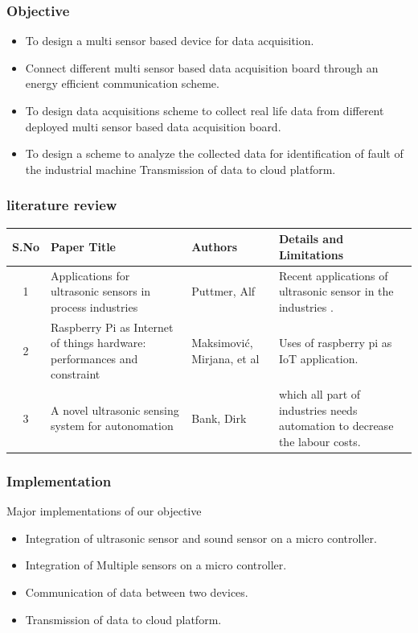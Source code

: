 \documentclass{beamer}
\begin{document}
\begin{frame}\frametitle{Objective}
\begin{itemize}

\item To design a multi sensor based device for data acquisition.
\item Connect different multi sensor based data acquisition board through an energy efficient communication scheme.
\item To design data acquisitions scheme to collect real life data from different deployed multi sensor based data acquisition board.
\item To design a scheme to analyze the collected data for identification of fault of the industrial machine Transmission of data to cloud platform.

\end{itemize}
\end{frame}
\begin{frame}[shrink=20]\frametitle{literature review}
\begin{table}[h]
    \begin{tabular}{|c|p{3cm}|p{3cm}|p{3cm}|}
    \hline
    \textbf{S.No} & \textbf{Paper Title} & \textbf{Authors} & \textbf{Details and Limitations}\\
    \hline
    1 &Applications for ultrasonic sensors in process industries &  Puttmer, Alf & Recent applications of ultrasonic sensor in the industries .\\
    \hline
    2 &Raspberry Pi as Internet of things hardware: performances and constraint &  Maksimović, Mirjana, et al & Uses of raspberry pi as IoT application.\\
    \hline
    3 & A novel ultrasonic sensing system for autonomation  &  Bank, Dirk & which all part of industries needs automation to decrease the labour costs.\\
    \hline
 
  \end{tabular}
\end{table}
\end{frame}
\begin{frame}\frametitle{Implementation}
\item Major implementations of our objective 
\begin{itemize}

\item Integration of ultrasonic sensor and sound sensor on a micro controller.
\item Integration of Multiple sensors on a micro controller.
\item Communication of data between two devices.
\item Transmission of data to cloud platform.

\end{itemize}
\end{frame}
\end{document}

